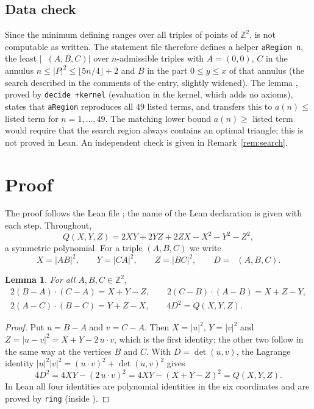 \documentclass[11pt]{amsart}
\theoremstyle{plain}
\newtheorem{lemma}[theorem]{Lemma}
\theoremstyle{definition}
\newcommand{\Z}{\mathbb{Z}}
\DeclareMathOperator{\dett}{det_2}
\begin{document}
\subsection*{Data check}
Since the minimum defining  ranges over all triples of points of $\Z^2$,  is not computable as written. The statement file therefore defines a helper \texttt{aRegion n}, the least $|\dett(A,B,C)|$ over $n$-admissible triples with $A=(0,0)$, $C$ in the annulus $n\le|P|^2\le\lfloor5n/4\rfloor+2$ and $B$ in the part $0\le y\le x$ of that annulus (the search described in the comments of the entry, slightly widened). The lemma , proved by \texttt{decide +kernel} (evaluation in the kernel, which adds no axioms), states that \texttt{aRegion} reproduces all $49$ listed terms, and  transfers this to $a(n)\le$ listed term for $n=1,\dots,49$. The matching lower bound $a(n)\ge$ listed term would require that the search region always contains an optimal triangle; this is not proved in Lean. An independent check is given in Remark~\ref{rem:search}.

\section{Proof}\label{sec:proof}

The proof follows the Lean file ; the name of the Lean declaration is given with each step. Throughout,
\[
  Q(X,Y,Z)=2XY+2YZ+2ZX-X^2-Y^2-Z^2 ,
\]
a symmetric polynomial. For a triple $(A,B,C)$ we write
\[
  X=|AB|^2,\qquad Y=|CA|^2,\qquad Z=|BC|^2,\qquad D=\dett(A,B,C).
\]

\begin{lemma}\label{lem:id}
For all $A,B,C\in\Z^2$,
\begin{gather*}
  2(B-A)\cdot(C-A)=X+Y-Z,\qquad 2(C-B)\cdot(A-B)=X+Z-Y,\\
  2(A-C)\cdot(B-C)=Y+Z-X,\qquad 4D^2=Q(X,Y,Z).
\end{gather*}
\end{lemma}

\begin{proof}
Put $u=B-A$ and $v=C-A$. Then $X=|u|^2$, $Y=|v|^2$ and $Z=|u-v|^2=X+Y-2\,u\cdot v$, which is the first identity; the other two follow in the same way at the vertices $B$ and $C$. With $D=\det(u,v)$, the Lagrange identity $|u|^2|v|^2=(u\cdot v)^2+\det(u,v)^2$ gives
\[
  4D^2=4XY-(2\,u\cdot v)^2=4XY-(X+Y-Z)^2=Q(X,Y,Z).
\]
In Lean all four identities are polynomial identities in the six coordinates and are proved by \texttt{ring} (inside ).
\end{proof}
\end{document}
